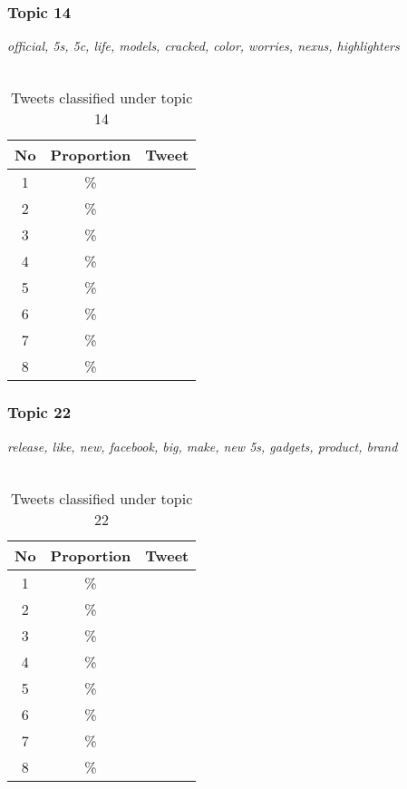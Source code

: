 \subsubsection{Topic 14}
\label{sec:topic_14}
\textit{official, 5s, 5c, life, models, cracked, color, worries, nexus, highlighters}\\\\

\begin{table}[H]
  \begin{tabular}{c c p{13cm}} \toprule
    No & Proportion & Tweet \\ \midrule
    1  & \%       & \\ \midrule
    2  & \%       & \\ \midrule
    3  & \%       & \\ \midrule
    4  & \%       & \\ \midrule
    5  & \%       & \\ \midrule
    6  & \%       & \\ \midrule
    7  & \%       & \\ \midrule
    8  & \%       & \\ \bottomrule
  \end{tabular}
  \caption{Tweets classified under topic 14}
  \label{tab:tweets_under_14}
\end{table}



\subsubsection{Topic 22}
\label{sec:topic_22}
\textit{release, like, new, facebook, big, make, new 5s, gadgets, product, brand}\\\\

\begin{table}[H]
  \begin{tabular}{c c p{13cm}} \toprule
    No & Proportion & Tweet \\ \midrule
    1  & \%       & \\ \midrule
    2  & \%       & \\ \midrule
    3  & \%       & \\ \midrule
    4  & \%       & \\ \midrule
    5  & \%       & \\ \midrule
    6  & \%       & \\ \midrule
    7  & \%       & \\ \midrule
    8  & \%       & \\ \bottomrule
  \end{tabular}
  \caption{Tweets classified under topic 22}
  \label{tab:tweets_under_22}
\end{table}



